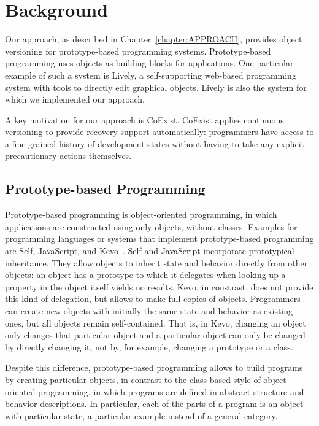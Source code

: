\chapter{Background} \label{chapter:BACKGROUND}

Our approach, as described in Chapter~\ref{chapter:APPROACH}, provides object versioning for prototype-based programming systems.
Prototype-based programming uses objects as building blocks for applications.
One particular example of such a system is Lively, a self-supporting web-based programming system with tools to directly edit graphical objects.
Lively is also the system for which we implemented our approach.

A key motivation for our approach is CoExist.
CoExist applies continuous versioning to provide recovery support automatically: programmers have access to a fine-grained history of development states without having to take any explicit precautionary actions themselves.

\section{Prototype-based Programming}

Prototype-based programming is object-oriented programming, in which applications are constructed using only objects, without classes.
Examples for programming languages or systems that implement prototype-based programming are Self, JavaScript, and Kevo~\cite{Taivalsaari1992Kevo}.
Self and JavaScript incorporate prototypical inheritance.
They allow objects to inherit state and behavior directly from other objects: an object has a prototype to which it delegates when looking up a property in the object itself yields no results.
Kevo, in constrast, does not provide this kind of delegation, but allows to make full copies of objects.
Programmers can create new objects with initially the same state and behavior as existing ones, but all objects remain self-contained.
That is, in Kevo, changing an object only changes that particular object and a particular object can only be changed by directly changing it, not by, for example, changing a prototype or a class.

Despite this difference, prototype-based programming allows to build programs by creating particular objects, in contrast to the class-based style of object-oriented programming, in which programs are defined in abstract structure and behavior descriptions.
In particular, each of the parts of a program is an object with particular state, a particular example instead of a general category.

